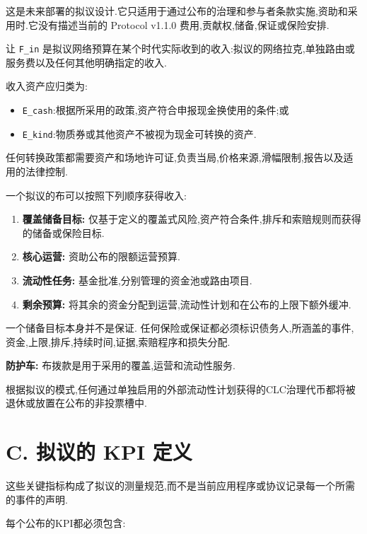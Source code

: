 \documentclass[11pt]{article}
\begin{document}
这是未来部署的拟议设计.它只适用于通过公布的治理和参与者条款实施,资助和采用时.它没有描述当前的 Protocol v1.1.0 费用,贡献权,储备,保证或保险安排.

让 \texttt{F\_in} 是拟议网络预算在某个时代实际收到的收入:拟议的网络拉克,单独路由或服务费以及任何其他明确指定的收入.

收入资产应归类为:

\begin{itemize}[leftmargin=*]
\item \texttt{E\_cash}:根据所采用的政策,资产符合申报现金换使用的条件;或
\item \texttt{E\_kind}:物质券或其他资产不被视为现金可转换的资产.
\end{itemize}
任何转换政策都需要资产和场地许可证,负责当局,价格来源,滑幅限制,报告以及适用的法律控制.

一个拟议的布可以按照下列顺序获得收入:

\begin{enumerate}[leftmargin=*]
\item \textbf{覆盖储备目标:} 仅基于定义的覆盖式风险,资产符合条件,排斥和索赔规则而获得的储备或保险目标.
\item \textbf{核心运营:} 资助公布的限额运营预算.
\item \textbf{流动性任务:} 基金批准,分别管理的资金池或路由项目.
\item \textbf{剩余预算:} 将其余的资金分配到运营,流动性计划和在公布的上限下额外缓冲.
\end{enumerate}
一个储备目标本身并不是保证. 任何保险或保证都必须标识债务人,所涵盖的事件,资金,上限,排斥,持续时间,证据,索赔程序和损失分配.

\textbf{防护车:} 布拨款是用于采用的覆盖,运营和流动性服务.

根据拟议的模式,任何通过单独启用的外部流动性计划获得的CLC治理代币都将被退休或放置在公布的非投票槽中.


\section*{C. 拟议的 KPI 定义}

这些关键指标构成了拟议的测量规范,而不是当前应用程序或协议记录每一个所需的事件的声明.

每个公布的KPI都必须包含:
\end{document}

